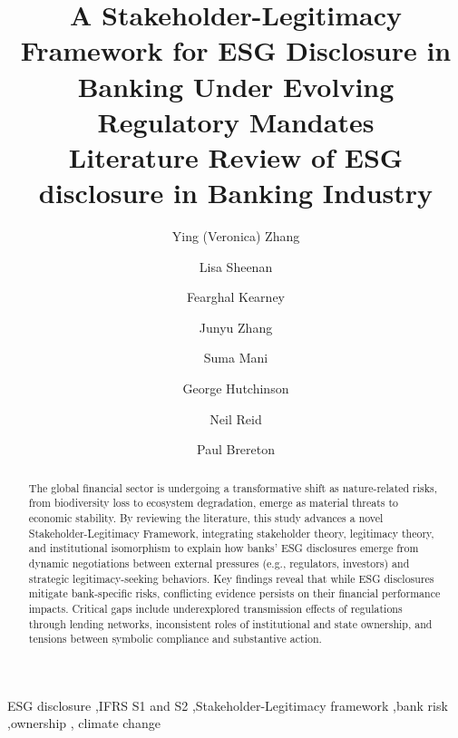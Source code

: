\documentclass[
  authoryear]{elsarticle}
\begin{document}
\begin{frontmatter}
\title{A Stakeholder-Legitimacy Framework for ESG Disclosure in Banking
Under Evolving Regulatory Mandates \\\large{Literature Review of ESG
disclosure in Banking Industry} }

\author[1]{Ying (Veronica) Zhang%
%
}
\author[2]{Lisa Sheenan%
%
}
\author[1]{Fearghal Kearney%
%
}
\author[3]{Junyu Zhang%
%
}

\author[3]{Suma Mani%
%
}

\author[3]{George Hutchinson%
%
}

\author[3]{Neil Reid%
%
}

\author[3]{Paul Brereton%
%
}










        
\begin{abstract}
The global financial sector is undergoing a transformative shift as
nature-related risks, from biodiversity loss to ecosystem degradation,
emerge as material threats to economic stability. By reviewing the
literature, this study advances a novel Stakeholder-Legitimacy
Framework, integrating stakeholder theory, legitimacy theory, and
institutional isomorphism to explain how banks' ESG disclosures emerge
from dynamic negotiations between external pressures (e.g., regulators,
investors) and strategic legitimacy-seeking behaviors. Key findings
reveal that while ESG disclosures mitigate bank-specific risks,
conflicting evidence persists on their financial performance impacts.
Critical gaps include underexplored transmission effects of regulations
through lending networks, inconsistent roles of institutional and state
ownership, and tensions between symbolic compliance and substantive
action.
\end{abstract}





\begin{keyword}
    ESG disclosure \sep IFRS S1 and S2 \sep Stakeholder-Legitimacy
framework \sep bank risk \sep ownership \sep 
    climate change
\end{keyword}
\end{frontmatter}
    
\end{document}
